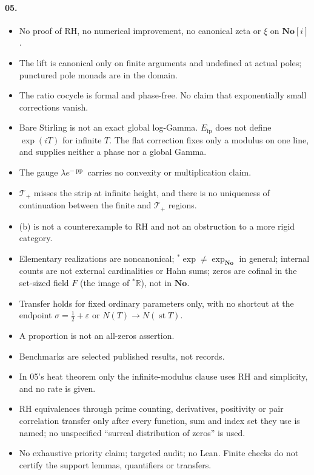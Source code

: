 \documentclass[11pt,a4paper]{article}
\numberwithin{equation}{section}
\theoremstyle{definition}
\theoremstyle{remark}
\newcommand{\No}{\mathbf{No}}
\newcommand{\R}{\mathbb R}
\newcommand{\eps}{\varepsilon}
\newcommand{\st}{\operatorname{st}}
\newcommand{\pp}{\operatorname{pp}}
\newcommand{\Efp}{E_{\mathrm{fp}}}
\newcommand{\Tp}{\mathcal T_{+}}
\begin{document}
\paragraph{05.}
\begin{itemize}
\item No proof of RH, no numerical improvement, no canonical zeta or $\xi$ on
 $\No[i]$.
\item The lift is canonical only on finite arguments and undefined at actual
 poles; punctured pole monads are in the domain.
\item The ratio cocycle is formal and phase-free. No claim that exponentially
 small corrections vanish.
\item Bare Stirling is not an exact global log-Gamma. $\Efp$ does not define
 $\exp(iT)$ for infinite $T$. The flat correction fixes only a modulus on one
 line, and supplies neither a phase nor a global Gamma.
\item The gauge $\lambda e^{-\pp}$ carries no convexity or multiplication claim.
\item $\Tp$ misses the strip at infinite height, and there is no uniqueness of
 continuation between the finite and $\Tp$ regions.
\item {}(b) is not a counterexample to RH and not an obstruction
 to a more rigid category.
\item Elementary realizations are noncanonical; ${}^*\exp\ne\exp_{\No}$ in
 general; internal counts are not external cardinalities or Hahn sums; zeros
 are cofinal in the set-sized field $F$ (the image of ${}^*\R$), not in $\No$.
\item Transfer holds for fixed ordinary parameters only, with no shortcut at
 the endpoint $\sigma=\tfrac12+\eps$ or $N(T)\to N(\st T)$.
\item A proportion is not an all-zeros assertion.
\item Benchmarks are selected published results, not records.
\item In 05's heat theorem only the infinite-modulus clause uses RH and
 simplicity, and no rate is given.
\item RH equivalences through prime counting, derivatives, positivity or pair
 correlation transfer only after every function, sum and index set they use
 is named; no unspecified ``surreal distribution of zeros'' is used.
\item No exhaustive priority claim; targeted audit; no Lean. Finite checks do
 not certify the support lemmas, quantifiers or transfers.
\end{itemize}
\end{document}
